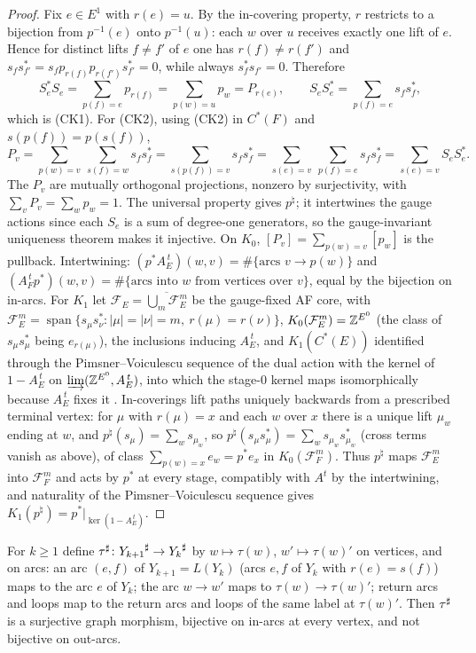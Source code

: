 \begin{proof}
Fix $e\in E^1$ with $r(e)=u$. By the in-covering property, $r$ restricts to a bijection
from $p^{-1}(e)$ onto $p^{-1}(u)$: each $w$ over $u$ receives exactly one lift of $e$.
Hence for distinct lifts $f\ne f'$ of $e$ one has $r(f)\ne r(f')$ and
$s_fs_{f'}^*=s_fp_{r(f)}p_{r(f')}s_{f'}^*=0$, while always $s_f^*s_{f'}=0$. Therefore
\[
S_e^*S_e=\sum_{p(f)=e}p_{r(f)}=\sum_{p(w)=u}p_w=P_{r(e)},\qquad
S_eS_e^*=\sum_{p(f)=e}s_fs_f^* ,
\]
which is (CK1). For (CK2), using (CK2) in $C^*(F)$ and $s(p(f))=p(s(f))$,
\[
P_v=\sum_{p(w)=v}\ \sum_{s(f)=w}s_fs_f^*=\sum_{s(p(f))=v}s_fs_f^*
=\sum_{s(e)=v}\ \sum_{p(f)=e}s_fs_f^*=\sum_{s(e)=v}S_eS_e^* .
\]
The $P_v$ are mutually orthogonal projections, nonzero by surjectivity, with
$\sum_vP_v=\sum_wp_w=1$. The universal property gives $p^\natural$; it intertwines the
gauge actions since each $S_e$ is a sum of degree-one generators, so the gauge-invariant
uniqueness theorem \cite[Thm.~2.2]{R} makes it injective. On $K_0$,
$[P_v]=\sum_{p(w)=v}[p_w]$ is the pullback. Intertwining: $(p^*A_E^{\,t})(w,v)=
\#\{\text{arcs }v\to p(w)\}$ and $(A_F^{\,t}p^*)(w,v)=\#\{\text{arcs into }w\text{ from
vertices over }v\}$, equal by the bijection on in-arcs. For $K_1$ let
$\mathcal F_E=\overline{\bigcup_m\mathcal F_E^m}$ be the gauge-fixed AF core, with
$\mathcal F_E^m=\operatorname{span}\{s_\mu s_\nu^*:|\mu|=|\nu|=m,\ r(\mu)=r(\nu)\}$,
$K_0(\mathcal F_E^m)=\mathbb{Z}^{E^0}$ (the class of $s_\mu s_\mu^*$ being $e_{r(\mu)}$), the
inclusions inducing $A_E^{\,t}$, and $K_1(C^*(E))$ identified through the
Pimsner--Voiculescu sequence of the dual action with the kernel of $1-A_E^{\,t}$ on
$\varinjlim(\mathbb{Z}^{E^0},A_E^{\,t})$, into which the stage-$0$ kernel maps isomorphically
because $A_E^{\,t}$ fixes it \cite[Ch.~7]{R}. In-coverings lift paths uniquely backwards
from a prescribed terminal vertex: for $\mu$ with $r(\mu)=x$ and each $w$ over $x$ there
is a unique lift $\mu_w$ ending at $w$, and $p^\natural(s_\mu)=\sum_ws_{\mu_w}$, so
$p^\natural(s_\mu s_\mu^*)=\sum_ws_{\mu_w}s_{\mu_w}^*$ (cross terms vanish as above),
of class $\sum_{p(w)=x}e_w=p^*e_x$ in $K_0(\mathcal F_F^m)$. Thus $p^\natural$ maps
$\mathcal F_E^m$ into $\mathcal F_F^m$ and acts by $p^*$ at every stage, compatibly with
$A^{t}$ by the intertwining, and naturality of the Pimsner--Voiculescu sequence gives
$K_1(p^\natural)=p^*|_{\ker(1-A_E^{\,t})}$.
\end{proof}

\begin{proposition}\label{VIII:prop:tausharp}
For $k\ge1$ define ${\tau}^{\sharp}\colon{Y_{k+1}}^{\sharp}\to{Y_k}^{\sharp}$ by
$w\mapsto\tau(w)$, $w'\mapsto\tau(w)'$ on vertices, and on arcs: an arc $(e,f)$ of
$Y_{k+1}=L(Y_k)$ (arcs $e,f$ of $Y_k$ with $r(e)=s(f)$) maps to the arc $e$ of $Y_k$;
the arc $w\to w'$ maps to $\tau(w)\to\tau(w)'$; return arcs and loops map to the return
arcs and loops of the same label at $\tau(w)'$. Then ${\tau}^{\sharp}$ is a surjective graph
morphism, bijective on in-arcs at every vertex, and not bijective on out-arcs.
\end{proposition}

